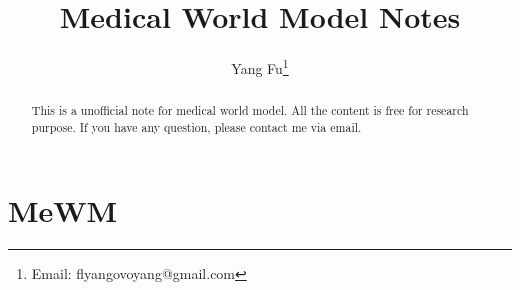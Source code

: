 \documentclass{article}
\title{Medical World Model Notes}
\author{Yang Fu\thanks{Email: flyangovoyang@gmail.com}}
\date{}
\begin{document}
\maketitle

\begin{abstract}
This is a unofficial note for medical world model.
All the content is free for research purpose.
If you have any question, please contact me via email.
\end{abstract}

\section{MeWM}

\printbibliography
\end{document}
